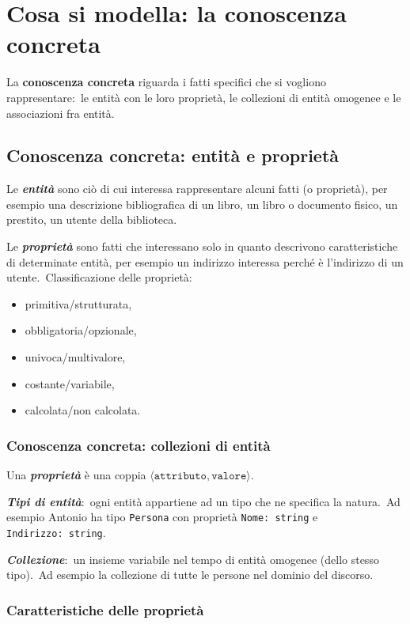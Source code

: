 \section{Cosa si modella: la conoscenza concreta}
La \textbf{conoscenza concreta} riguarda i fatti specifici che si vogliono rappresentare:\ le entità con le loro proprietà, le collezioni di entità omogenee e le associazioni fra entità.

\subsection{Conoscenza concreta: entità e proprietà}
Le \textbf{\textit{entità}} sono ciò di cui interessa rappresentare alcuni fatti (o proprietà), per esempio una descrizione bibliografica di un libro, un libro o documento fisico, un prestito, un utente della biblioteca.

Le \textbf{\textit{proprietà}} sono fatti che interessano solo in quanto descrivono caratteristiche di determinate entità, per esempio un indirizzo interessa perché è l'indirizzo di un utente.\
Classificazione delle proprietà:
\begin{itemize}
	\item primitiva/strutturata,
	\item obbligatoria/opzionale,
	\item univoca/multivalore,
	\item costante/variabile,
	\item calcolata/non calcolata.
\end{itemize}

\subsubsection{Conoscenza concreta: collezioni di entità}
Una \textbf{\textit{proprietà}} è una coppia $\langle\mathtt{attributo, valore}\rangle$.

\noindent\textbf{\textit{Tipi di entità}}:\ ogni entità appartiene ad un tipo che ne specifica la natura.\
Ad esempio Antonio ha tipo \texttt{Persona} con proprietà \texttt{Nome:\ string} e \texttt{Indirizzo:\ string}.

\noindent \textbf{\textit{Collezione}}:\ un insieme variabile nel tempo di entità omogenee (dello stesso tipo).\
Ad esempio la collezione di tutte le persone nel dominio del discorso.

\subsubsection{Caratteristiche delle proprietà}

